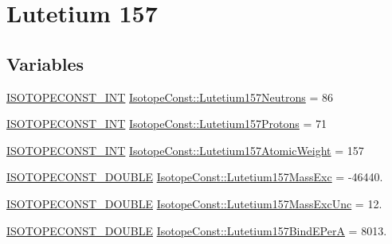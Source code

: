 \hypertarget{group___isotope_const-_lutetium-_lu157}{}\section{Lutetium 157}
\label{group___isotope_const-_lutetium-_lu157}
\subsection*{Variables}
\begin{DoxyCompactItemize}
\item 
\mbox{\hyperlink{group___isotope_const-_macros_ga5f18360b3e99483a35c32d789e62621c}{I\+S\+O\+T\+O\+P\+E\+C\+O\+N\+S\+T\+\_\+\+I\+NT}} \mbox{\hyperlink{group___isotope_const-_lutetium-_lu157_gaf7f0b42f5af3af336efdc4f48841b4c6}{Isotope\+Const\+::\+Lutetium157\+Neutrons}} = 86
\item 
\mbox{\hyperlink{group___isotope_const-_macros_ga5f18360b3e99483a35c32d789e62621c}{I\+S\+O\+T\+O\+P\+E\+C\+O\+N\+S\+T\+\_\+\+I\+NT}} \mbox{\hyperlink{group___isotope_const-_lutetium-_lu157_ga03edb92f07e371e589022a9400632b5e}{Isotope\+Const\+::\+Lutetium157\+Protons}} = 71
\item 
\mbox{\hyperlink{group___isotope_const-_macros_ga5f18360b3e99483a35c32d789e62621c}{I\+S\+O\+T\+O\+P\+E\+C\+O\+N\+S\+T\+\_\+\+I\+NT}} \mbox{\hyperlink{group___isotope_const-_lutetium-_lu157_gadb5740b1f56073cc43e453677db4510f}{Isotope\+Const\+::\+Lutetium157\+Atomic\+Weight}} = 157
\item 
\mbox{\hyperlink{group___isotope_const-_macros_ga8f45a7272ce02c0b4c65c44636ed719a}{I\+S\+O\+T\+O\+P\+E\+C\+O\+N\+S\+T\+\_\+\+D\+O\+U\+B\+LE}} \mbox{\hyperlink{group___isotope_const-_lutetium-_lu157_ga7b54cbda4e1889a6085ef486f64406fc}{Isotope\+Const\+::\+Lutetium157\+Mass\+Exc}} = -\/46440.
\item 
\mbox{\hyperlink{group___isotope_const-_macros_ga8f45a7272ce02c0b4c65c44636ed719a}{I\+S\+O\+T\+O\+P\+E\+C\+O\+N\+S\+T\+\_\+\+D\+O\+U\+B\+LE}} \mbox{\hyperlink{group___isotope_const-_lutetium-_lu157_ga74d29286a265bbeb415762621e29a711}{Isotope\+Const\+::\+Lutetium157\+Mass\+Exc\+Unc}} = 12.
\item 
\mbox{\hyperlink{group___isotope_const-_macros_ga8f45a7272ce02c0b4c65c44636ed719a}{I\+S\+O\+T\+O\+P\+E\+C\+O\+N\+S\+T\+\_\+\+D\+O\+U\+B\+LE}} \mbox{\hyperlink{group___isotope_const-_lutetium-_lu157_ga462379fb155a6fc53283b92564e4eac6}{Isotope\+Const\+::\+Lutetium157\+Bind\+E\+PerA}} = 8013.
\item 

\end{DoxyCompactItemize}
